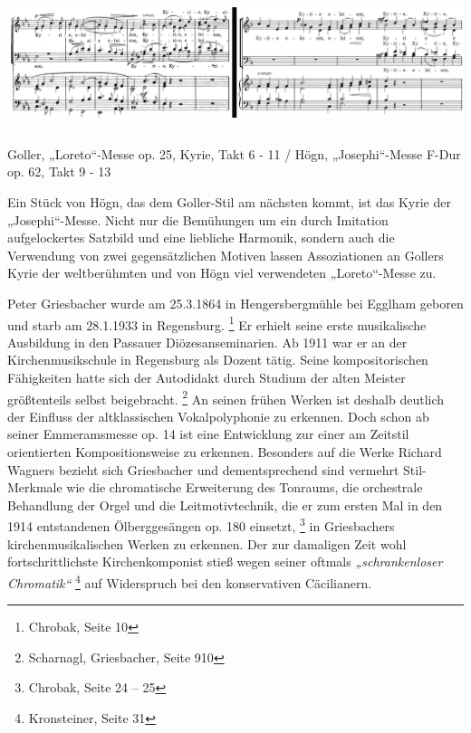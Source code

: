 \includegraphics[width=15.977cm,height=3.87cm]{pictures/zulassungsarbeit-img090.png}

Goller, „Loreto“-Messe op. 25, Kyrie,
Takt 6 - 11 / Högn, „Josephi“-Messe F-Dur op. 62, Takt 9 - 13

Ein Stück von Högn, das dem Goller-Stil am nächsten kommt, ist das Kyrie
der „Josephi“-Messe. Nicht nur die Bemühungen um ein durch Imitation
aufgelockertes Satzbild und eine liebliche Harmonik, sondern auch die
Verwendung von zwei gegensätzlichen Motiven lassen Assoziationen an
Gollers Kyrie der weltberühmten und von Högn viel verwendeten
„Loreto“-Messe zu.

Peter Griesbacher wurde am 25.3.1864 in Hengersbergmühle bei Egglham
geboren und starb am 28.1.1933 in Regensburg. \footnote{Chrobak, Seite
10} Er erhielt seine erste musikalische Ausbildung in den Passauer
Diözesanseminarien. Ab 1911 war er an der Kirchenmusikschule in
Regensburg als Dozent tätig. Seine kompositorischen Fähigkeiten hatte
sich der Autodidakt durch Studium der alten Meister größtenteils selbst
beigebracht. \footnote{Scharnagl, Griesbacher, Seite 910} An seinen
frühen Werken ist deshalb deutlich der Einfluss der altklassischen
Vokalpolyphonie zu erkennen. Doch schon ab seiner Emmeramsmesse op. 14
ist eine Entwicklung zur einer am Zeitstil orientierten
Kompositionsweise zu erkennen. Besonders auf die Werke Richard Wagners
bezieht sich Griesbacher und dementsprechend sind vermehrt
Stil-Merkmale wie die chromatische Erweiterung des Tonraums, die
orchestrale Behandlung der Orgel und die Leitmotivtechnik, die er zum
ersten Mal in den 1914 entstandenen Ölberggesängen op. 180
einsetzt, \footnote{Chrobak, Seite 24 – 25} in Griesbachers
kirchenmusikalischen Werken zu erkennen. Der zur damaligen Zeit wohl
fortschrittlichste Kirchenkomponist stieß wegen seiner oftmals
\textit{„schrankenloser Chromatik“ } \footnote{Kronsteiner, Seite 31}
auf Widerspruch bei den konservativen Cäcilianern.

